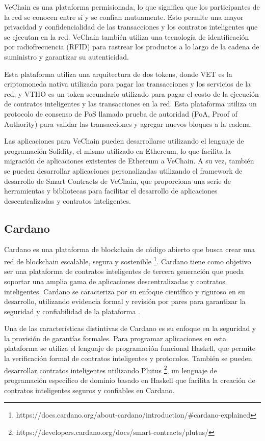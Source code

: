 \documentclass[theoretical-framework.tex]{subfiles}
\begin{document}
VeChain es una plataforma permisionada, lo que significa que los participantes de la red se conocen entre sí y se confían mutuamente. Esto permite una mayor privacidad y confidencialidad de las transacciones y los contratos inteligentes que se ejecutan en la red. VeChain también utiliza una tecnología de identificación por radiofrecuencia (RFID) para rastrear los productos a lo largo de la cadena de suministro y garantizar su autenticidad.

Esta plataforma utiliza una arquitectura de dos tokens, donde VET es la criptomoneda nativa utilizada para pagar las transacciones y los servicios de la red, y VTHO es un token secundario utilizado para pagar el costo de la ejecución de contratos inteligentes y las transacciones en la red. Esta plataforma utiliza un protocolo de consenso de PoS llamado prueba de autoridad (PoA, Proof of Authority) para validar las transacciones y agregar nuevos bloques a la cadena.

Las aplicaciones para VeChain pueden desarrollarse utilizando el lenguaje de programación Solidity, el mismo utilizado en Ethereum, lo que facilita la migración de aplicaciones existentes de Ethereum a VeChain. A su vez, también se pueden desarrollar aplicaciones personalizadas utilizando el framework de desarrollo de Smart Contracts de VeChain, que proporciona una serie de herramientas y bibliotecas para facilitar el desarrollo de aplicaciones descentralizadas y contratos inteligentes.

\subsection{Cardano}

Cardano es una plataforma de blockchain de código abierto que busca crear una red de blockchain escalable, segura y sostenible \footnote{https://docs.cardano.org/about-cardano/introduction/\#cardano-explained}. Cardano tiene como objetivo ser una plataforma de contratos inteligentes de tercera generación que pueda soportar una amplia gama de aplicaciones descentralizadas y contratos inteligentes. Cardano se caracteriza por su enfoque científico y riguroso en su desarrollo, utilizando evidencia formal y revisión por pares para garantizar la seguridad y confiabilidad de la plataforma \cite{hoskinson2017we}.

Una de las características distintivas de Cardano es su enfoque en la seguridad y la provisión de garantías formales. Para programar aplicaciones en esta plataforma se utiliza el lenguaje de programación funcional Haskell, que permite la verificación formal de contratos inteligentes y protocolos. También se pueden desarrollar contratos inteligentes utilizando Plutus \cite{chakravarty2019functional}\footnote{https://developers.cardano.org/docs/smart-contracts/plutus/}, un lenguaje de programación específico de dominio basado en Haskell que facilita la creación de contratos inteligentes seguros y confiables en Cardano.
\end{document}
